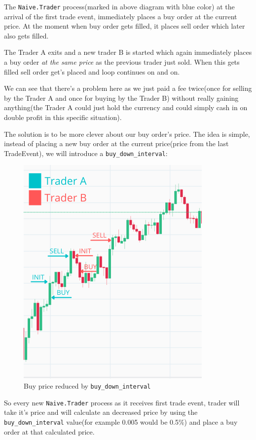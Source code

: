 \documentclass[
]{book}
\begin{document}
The \texttt{Naive.Trader} process(marked in above diagram with blue color) at the arrival of the first trade event, immediately places a buy order at the current price. At the moment when buy order gets filled, it places sell order which later also gets filled.

The Trader A exits and a new trader B is started which again immediately places a buy order \emph{at the same price} as the previous trader just sold. When this gets filled sell order get's placed and loop continues on and on.

We can see that there's a problem here as we just paid a fee twice(once for selling by the Trader A and once for buying by the Trader B) without really gaining anything(the Trader A could just hold the currency and could simply cash in on double profit in this specific situation).

The solution is to be more clever about our buy order's price. The idea is simple, instead of placing a new buy order at the current price(price from the last TradeEvent), we will introduce a \texttt{buy\_down\_interval}:

\begin{figure}
\centering
\includegraphics{images/chapter_06_02_rebuy_expl.png}
\caption{Buy price reduced by \texttt{buy\_down\_interval}}
\end{figure}

So every new \texttt{Naive.Trader} process as it receives first trade event, trader will take it's price and will calculate an decreased price by using the \texttt{buy\_down\_interval} value(for example 0.005 would be 0.5\%) and place a buy order at that calculated price.
\end{document}
